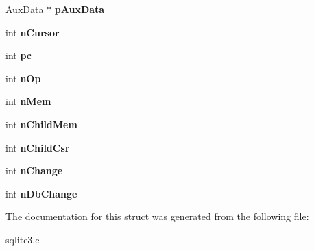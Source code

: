 \begin{DoxyCompactItemize}
\item 
\hyperlink{structAuxData}{Aux\+Data} $\ast$ {\bfseries p\+Aux\+Data}\hypertarget{structVdbeFrame_a199f005c277fcaeca33abf86c0a865bc}{}\label{structVdbeFrame_a199f005c277fcaeca33abf86c0a865bc}

\item 
int {\bfseries n\+Cursor}\hypertarget{structVdbeFrame_a9b74ca630c19ab905db3be4e78dbd9e1}{}\label{structVdbeFrame_a9b74ca630c19ab905db3be4e78dbd9e1}

\item 
int {\bfseries pc}\hypertarget{structVdbeFrame_aed0e6d8cb1908580a3c2aca04516b46c}{}\label{structVdbeFrame_aed0e6d8cb1908580a3c2aca04516b46c}

\item 
int {\bfseries n\+Op}\hypertarget{structVdbeFrame_acffd5d53fbb5cb55e257c34a547c1762}{}\label{structVdbeFrame_acffd5d53fbb5cb55e257c34a547c1762}

\item 
int {\bfseries n\+Mem}\hypertarget{structVdbeFrame_ab340f2b5f6d6e09a872f5f8a64fec245}{}\label{structVdbeFrame_ab340f2b5f6d6e09a872f5f8a64fec245}

\item 
int {\bfseries n\+Child\+Mem}\hypertarget{structVdbeFrame_a833bdf519676567bc3a700cdedc6562d}{}\label{structVdbeFrame_a833bdf519676567bc3a700cdedc6562d}

\item 
int {\bfseries n\+Child\+Csr}\hypertarget{structVdbeFrame_a2d2900348092258d12eb71057812429a}{}\label{structVdbeFrame_a2d2900348092258d12eb71057812429a}

\item 
int {\bfseries n\+Change}\hypertarget{structVdbeFrame_a77aacb67d627f4446dd50a795b5a2f0f}{}\label{structVdbeFrame_a77aacb67d627f4446dd50a795b5a2f0f}

\item 
int {\bfseries n\+Db\+Change}\hypertarget{structVdbeFrame_ab25b753f6356e7b9561717a58cfa4181}{}\label{structVdbeFrame_ab25b753f6356e7b9561717a58cfa4181}

\end{DoxyCompactItemize}


The documentation for this struct was generated from the following file\+:\begin{DoxyCompactItemize}
\item 
sqlite3.\+c\end{DoxyCompactItemize}
